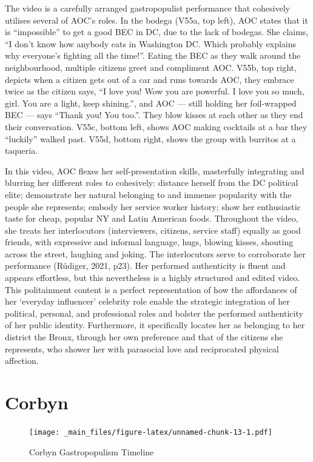 \documentclass[a4paper, nobind]{templates/ociamthesis}
\begin{document}
The video is a carefully arranged gastropopulist performance that cohesively utilises several of AOC's roles.
In the bodega (V55a, top left), AOC states that it is ``impossible'' to get a good BEC in DC, due to the lack of bodegas.
She claims, ``I don't know how anybody eats in Washington DC. Which probably explains why everyone's fighting all the time!''.
Eating the BEC as they walk around the neighbourhood, multiple citizens greet and compliment AOC.
V55b, top right, depicts when a citizen gets out of a car and runs towards AOC, they embrace twice as the citizen says, ``I love you! Wow you are powerful. I love you so much, girl. You are a light, keep shining.'', and AOC --- still holding her foil-wrapped BEC --- says ``Thank you! You too.''.
They blow kisses at each other as they end their conversation.
V55c, bottom left, shows AOC making cocktails at a bar they ``luckily'' walked past.
V55d, bottom right, shows the group with burritos at a taqueria.

In this video, AOC flexes her self-presentation skills, masterfully integrating and blurring her different roles to cohesively: distance herself from the DC political elite; demonstrate her natural belonging to and immense popularity with the people she represents; embody her service worker history; show her enthusiastic taste for cheap, popular NY and Latin American foods.
Throughout the video, she treats her interlocutors (interviewers, citizens, service staff) equally as good friends, with expressive and informal language, hugs, blowing kisses, shouting across the street, laughing and joking. The interlocutors serve to corroborate her performance (Rüdiger, 2021, p23).
Her performed authenticity is fluent and appears effortless, but this nevertheless is a highly structured and edited video.
This politainment content is a perfect representation of how the affordances of her `everyday influencer' celebrity role enable the strategic integration of her political, personal, and professional roles and bolster the performed authenticity of her public identity.
Furthermore, it specifically locates her as belonging to her district the Bronx, through her own preference and that of the citizens she represents, who shower her with parasocial love and reciprocated physical affection.

\hypertarget{corbyn}{%
\section{Corbyn}\label{corbyn}}

\begin{figure}
\centering
\texttt{[image: \_main\_files/figure-latex/unnamed-chunk-13-1.pdf]}
\caption{\label{fig:unnamed-chunk-13}Corbyn Gastropopulism Timeline}
\end{figure}
\end{document}
